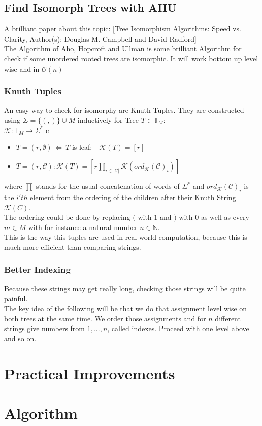 \documentclass[a4paper,12pt]{article}
\theoremstyle{definition}
\begin{document}
	\subsection{Find Isomorph Trees with AHU}
	\hyperlink{www.jstor.org/stable/pdf/2690833.pdf}{A brilliant paper about this topic}: [Tree Isomorphism Algorithms: Speed vs. Clarity,\quad
	Author(s): Douglas M. Campbell and David Radford]\\
	The Algorithm of Aho, Hopcroft and Ullman is some brilliant Algorithm for check if some unordered rooted trees are isomorphic. It will work bottom up level wise and in $\mathcal{O}(n)$
	\subsubsection{Knuth Tuples}
	An easy way to check for isomorphy are Knuth Tuples. They are constructed using $\Sigma =\{(,)\}\cup M$ inductively for Tree $T\in \mathds{T}_M$:\\
	$\mathcal{K}: \mathds{T}_M \longrightarrow \Sigma^*$
	c\begin{itemize}
		\item $T=(r,\emptyset)\,\Leftrightarrow\, T$  is leaf:$\quad \mathcal{K} (T) =[r]$
		\item $T=(r,\mathcal{C}): \mathcal{K}(T)=[r \prod_{i\in |\mathcal{C}|} \mathcal K(ord_{\mathcal{K}}(\mathcal{C})_i)]$
	\end{itemize}
	where $\prod$ stands for the usual concatenation of words of $\Sigma^*$ and $ord_{\mathcal{K}}(\mathcal{C})_i$ is the $i'th$ element from the ordering of the children after their Knuth String $\mathcal{K}(C)$.\\
	The ordering could be done by replacing $($ with $1$ and $)$ with $0$ as well as every $m\in M$ with for instance a natural number $n\in \mathds{N}$.\\
	This is the way this tuples are used in real world computation, because this is much more efficient than comparing strings.
	\subsubsection{Better Indexing}
	Because these strings may get really long, checking those strings will be quite painful.\\
	The key idea of the following will be that we do that assignment level wise on both trees at the same time. We order those assignments and for $n$ different strings give numbers from $1,...,n$, called indexes. Proceed with one level above and so on.
	\section{Practical Improvements}
	\section{Algorithm}
		
\end{document}
